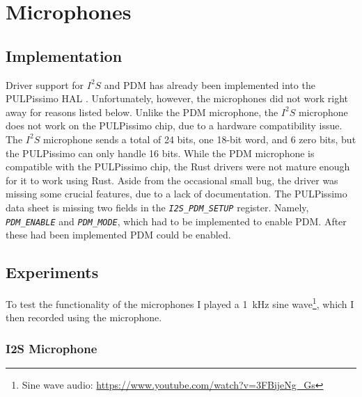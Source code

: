 

\section{Microphones}

\subsection{Implementation}

Driver support for $I^2S$ and PDM has already been implemented into the PULPissimo HAL \cite[Cha 4.3.7]{rust_pulp}.
Unfortunately, however, the microphones did not work right away for reasons listed below.
Unlike the PDM microphone, the $I^2S$ microphone does not work on the PULPissimo chip, due to a hardware compatibility issue.
The $I^2S$ microphone sends a total of 24 bits, one 18-bit word, and 6 zero bits, but the PULPissimo can only handle 16 bits.
While the PDM microphone is compatible with the PULPissimo chip, the Rust drivers were not mature enough for it to work using Rust.
Aside from the occasional small bug, the driver was missing some crucial features, due to a lack of documentation.
The PULPissimo data sheet \cite[Cha 4.8.67]{pulpissimo_datasheet} is missing two fields in the \emph{\lstinline{I2S_PDM_SETUP}} register.
Namely, \emph{\lstinline{PDM_ENABLE}} and \emph{\lstinline{PDM_MODE}}, which had to be implemented to enable PDM.
After these had been implemented PDM could be enabled.

\subsection{Experiments}

To test the functionality of the microphones I played a \SI{1}{\kilo\hertz} sine wave\footnote{Sine wave audio: \url{https://www.youtube.com/watch?v=3FBijeNg_Gs}},
which I then recorded using the microphone.

\subsubsection{I2S Microphone}

